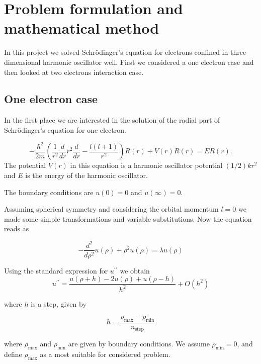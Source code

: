 \documentclass[10pt]{article}
\begin{document}
\newpage
\section{Problem formulation and mathematical method}\label{Part1}
In this project we solved Schr\"{o}dinger's equation for electrons confined in three dimensional harmonic oscillator well. First we considered a one electron case and then looked at two electrons interaction case. 

\subsection{One electron case}
In the first place we are interested in the solution of the radial part of Schr\"{o}dinger's equation for one electron. 

\begin{equation*}
  -\frac{\hbar^2}{2 m} \left ( \frac{1}{r^2} \frac{d}{dr} r^2
  \frac{d}{dr} - \frac{l (l + 1)}{r^2} \right )R(r) 
     + V(r) R(r) = E R(r).
\end{equation*}
The potential $V(r)$  in this equation is a harmonic oscillator potential $(1/2)kr^2$ and $E$ is the energy of the harmonic oscillator. 

The boundary conditions are $u(0)=0$ and $u(\infty)=0$.

Assuming spherical symmetry and considering the orbital momentum $l=0$ we made some simple transformations and variable substitutions. Now the equation reads as


\begin{equation}
-\frac{d^{2}}{d\rho ^{2}}u(\rho )+\rho ^{2}u(\rho )=\lambda u(\rho )
\end{equation}

Using the standard expression for $u^{\prime \prime }$ we obtain 
\begin{equation}
u^{\prime \prime }=\frac{u(\rho +h)-2u(\rho )+u(\rho -h)}{h^{2}}+O(h^{2})
\end{equation}

where $h$ is a step, given by

\begin{equation}
h=\frac{\rho _{\mathrm{max}}-\rho _{\mathrm{min}}}{n_{\mathrm{step}}}
\end{equation}

where $\rho _{\mathrm{max}}$ and $\rho _{\mathrm{min}}$ are given by boundary conditions. We assume $\rho _{\mathrm{min}}=0$, and define $\rho_{\mathrm{max}}$ as a most suitable for considered problem.
\end{document}

